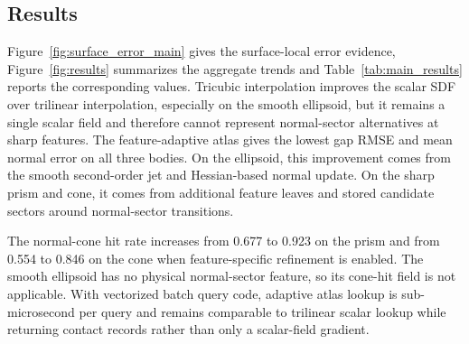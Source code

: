 \documentclass[preprint,12pt,sort&compress]{elsarticle}
\begin{document}
\subsection{Results}

Figure~\ref{fig:surface_error_main} gives the surface-local error evidence, Figure~\ref{fig:results} summarizes the aggregate trends and Table~\ref{tab:main_results} reports the corresponding values. Tricubic interpolation improves the scalar SDF over trilinear interpolation, especially on the smooth ellipsoid, but it remains a single scalar field and therefore cannot represent normal-sector alternatives at sharp features. The feature-adaptive atlas gives the lowest gap RMSE and mean normal error on all three bodies. On the ellipsoid, this improvement comes from the smooth second-order jet and Hessian-based normal update. On the sharp prism and cone, it comes from additional feature leaves and stored candidate sectors around normal-sector transitions.

\begin{table}[htbp]
\centering
\caption{Main geometric evidence. Arrows indicate the preferred direction; cone-hit is reported only for physical sharp-feature queries.}
\label{tab:main_results}

\end{table}

The normal-cone hit rate increases from 0.677 to 0.923 on the prism and from 0.554 to 0.846 on the cone when feature-specific refinement is enabled. The smooth ellipsoid has no physical normal-sector feature, so its cone-hit field is not applicable. With vectorized batch query code, adaptive atlas lookup is sub-microsecond per query and remains comparable to trilinear scalar lookup while returning contact records rather than only a scalar-field gradient.
\end{document}

